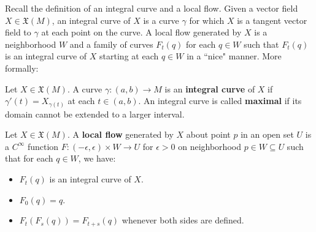Recall the definition of an integral curve and a local flow. Given a vector field $X\in\mathfrak X(M)$, an integral curve of $X$ is 
a curve $\gamma$ for which $X$ is a tangent vector field to $\gamma$ at each point on the curve. A local flow generated by 
$X$ is a neighborhood $W$ and a family of curves $F_t(q)$ for each $q\in W$ such that $F_t(q)$ is an integral curve of 
$X$ starting at each $q\in W$ in a ``nice" manner. More formally:
\begin{definition}
	Let $X\in\mathfrak X(M)$. A curve $\gamma : (a, b)\rightarrow M$ is an \textbf{integral curve} of $X$ if $\gamma'(t) = 
	X_{\gamma(t)}$ at each $t\in (a, b)$. An integral curve is called \textbf{maximal} if its domain cannot be extended to a 
	larger interval.
\end{definition}
\begin{definition}
	Let $X\in\mathfrak X(M)$. A \textbf{local flow} generated by $X$ about point $p$ in an open set $U$ is a $C^\infty$ 
	function $F : (-\epsilon, \epsilon)\times W\rightarrow U$ for $\epsilon > 0$ on neighborhood $p\in W\subseteq U$ such 
	that for each $q\in W$, we have:
	\begin{itemize}
		\item $F_t(q)$ is an integral curve of $X$. 
		\item $F_0(q) = q$. 
		\item $F_t(F_s(q)) = F_{t + s}(q)$ whenever both sides are defined. 
	\end{itemize}
\end{definition}

